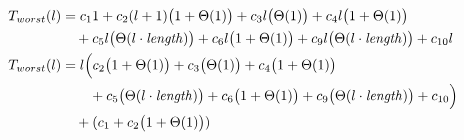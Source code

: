 \begin{subequations}
\label{eq:mergelines-all}
\begin{align}
\label{eq:mergelines-all-1}
T_{worst}(l)& =
c_{1}1
+ c_{2}(l+1)\bigl(1 + \Theta(1)\bigr)
+ c_{3}l\bigl(\Theta(1)\bigr)
+ c_{4}l\bigl(1 + \Theta(1)\bigr)
\\
& \quad
+ c_{5}l\bigl(\Theta(l \cdot \mathit{length})\bigr)
+ c_{6}l\bigl(1 + \Theta(1)\bigr)
+ c_{9}l\bigl(\Theta(l \cdot \mathit{length})\bigr)
+ c_{10}l
\nonumber \\
\label{eq:mergelines-all-1}
T_{worst}(l)& =
l\Bigl(c_{2}\bigl(1 + \Theta(1)\bigr) + c_{3}\bigl(\Theta(1)\bigr) + c_{4}\bigl(1 + \Theta(1)\bigr)
\\
& \quad \quad
 + c_{5}\bigl(\Theta(l \cdot \mathit{length})\bigr) + c_{6}\bigl(1 + \Theta(1)\bigr) + c_{9}\bigl(\Theta(l \cdot \mathit{length})\bigr) + c_{10}\Bigl)
\nonumber \\
& \quad
+ (c_{1} + c_{2}\bigl(1 + \Theta(1)\bigr))
\nonumber
\end{align}
\end{subequations}
